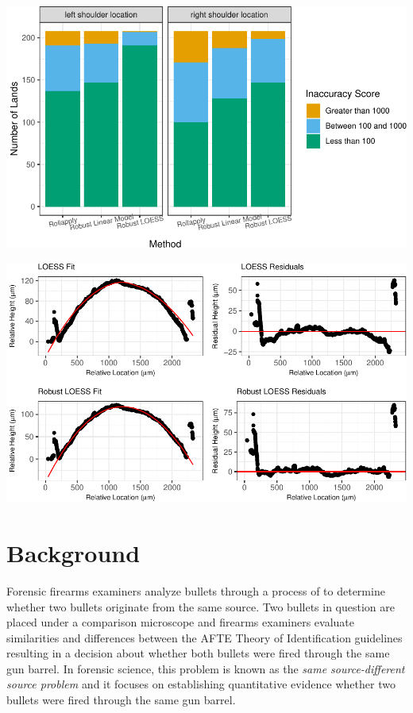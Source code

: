 \documentclass[12pt]{article}
\begin{document}
\includegraphics{writeup_files/figure-latex/unnamed-chunk-3-1.pdf}

\includegraphics{writeup_files/figure-latex/unnamed-chunk-4-1.pdf}

\section{Background}

Forensic firearms examiners analyze bullets through a process of
{\color{teal}{visual comparison}} to determine whether two bullets
originate from the same source. Two bullets in question are placed under
a comparison microscope and firearms examiners evaluate similarities and
differences between
{\color{teal}{striated toolmarks produced on fired bullets from rifled barrels. The assessment of these patterns follows}}
the AFTE Theory of Identification \citep{AFTE} guidelines resulting in a
decision about whether both bullets were fired through the same gun
barrel. In forensic science, this problem is known as the \emph{same
source-different source problem} \citep[see][]{Ommen1} and it focuses on
establishing quantitative evidence whether two bullets were fired
through the same gun barrel.
\end{document}
